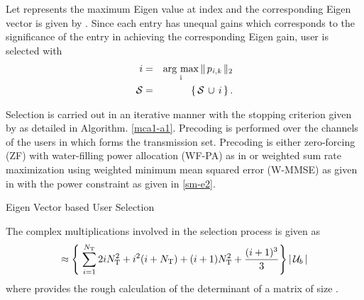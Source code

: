 Let  represents the maximum Eigen value at  index and the corresponding Eigen vector is given by . Since each entry  has unequal gains which corresponds to the significance of the entry in achieving the corresponding Eigen gain, user  is selected with
\begin{eqnarray}
i &=& \operatorname*{\arg\,max}_{\mathrm{i}} \|\, {p}_{\mathit{i},\mathit{k}} \,\|_{2} \label{mca1-e3:1} \\
\mathcal{S} &=& \left \lbrace \, \mathcal{S} \, \cup \, i \, \right \rbrace.
\label{mca1-e3}
\end{eqnarray}

Selection is carried out in an iterative manner with the stopping criterion given by  as detailed in Algorithm. \ref{mca1-a1}. Precoding is performed over the channels of the users in  which forms the transmission set. Precoding is either zero-forcing (ZF) with water-filling power allocation (WF-PA) as in \cite{tse2005fundamentals} or weighted sum rate maximization using weighted minimum mean squared error (W-MMSE) as given in \cite{wmmse_shi} with the power constraint as given in \eqref{sm-e2}.

\begin{algorithm}
 \SetAlgoLined
 \DontPrintSemicolon
 \caption{Eigen Vector based User Selection}
 \label{mca1-a1}
\end{algorithm}

The complex multiplications involved in the selection process is given as 
\begin{equation}
\approx \left \lbrace \; \sum_{i = 1}^{N_{\mathrm{T}}} 2i N^2_{\mathrm{T}} + i^2(i + N_{\mathrm{T}}) + (i + 1) N^2_{\mathrm{T}} + \frac{(i + 1)^3}{3} \right \rbrace | \, \mathcal{U}_b \, |
\label{mca1-e4}
\end{equation}
where  provides the rough calculation of the determinant of a matrix of size .
